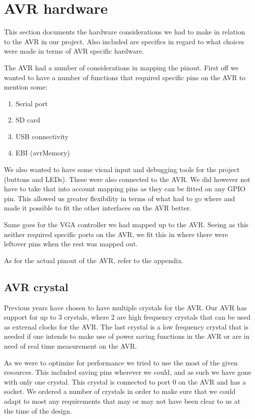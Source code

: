 \section{AVR hardware}

This section documents the hardware considerations we had to make in relation to
the AVR in our project. Also included are specifics in regard to what choices
were made in terms of AVR specific hardware.

The AVR had a number of considerations in mapping the pinout. First off we
wanted to have a number of functions that required specific pins on the AVR to
mention some:

\begin{enumerate}
\item Serial port
\item \ac{SD} card
\item \ac{USB} connectivity
\item \ac{EBI} (avrMemory)
\end{enumerate}

We also wanted to have some visual input and debugging tools for the project
(buttons and LEDs). These were also connected to the AVR. We did however not
have to take that into account mapping pins as they can be fitted on any
\ac{GPIO} pin. This allowed us greater flexibility in terms of what had to go
where and made it possible to fit the other interfaces on the AVR better.

Same goes for the \ac{VGA} controller we had mapped up to the AVR. Seeing
as this neither required specific ports on the AVR, we fit this in where
there were leftover pins when the rest was mapped out.

As for the actual pinout of the AVR, refer to the appendix.

\subsection{AVR crystal}

Previous years have chosen to have multiple crystals for the AVR. Our AVR has support for up to 3 crystals, where 2 are high frequency crystals that can be used as external clocks for the AVR. The last crystal is a low frequency crystal that is needed if one intends to make use of power saving functions in the AVR or are in need of real time measurement on the AVR. 

As we were to optimize for performance we tried to use the most of the given resources. This included saving pins wherever we could, and as such we have gone with only one crystal. This crystal is connected to port 0 on the AVR and has a socket. We ordered a number of crystals in order to make sure that we could adapt to most any requirements that may or may not have been clear to us at the time of the design.

